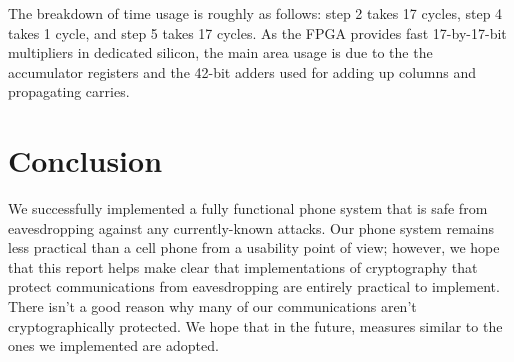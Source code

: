 \documentclass[a4paper]{report}
\begin{document}
The breakdown of time usage is roughly as follows: step 2 takes 17 cycles, step
4 takes 1 cycle, and step 5 takes 17 cycles. As the FPGA provides fast
17-by-17-bit multipliers in dedicated silicon, the main area usage is due to the
the accumulator registers and the 42-bit adders used for adding up columns and
propagating carries.



\section{Conclusion}

We successfully implemented a fully functional phone system that is safe from eavesdropping against any currently-known attacks. Our phone system remains less practical than a cell phone from a usability point of view; however, we hope that this report helps make clear that implementations of cryptography that protect communications from eavesdropping are entirely practical to implement. There isn't a good reason why many of our communications aren't cryptographically protected. We hope that in the future, measures similar to the ones we implemented are adopted.
\end{document}
